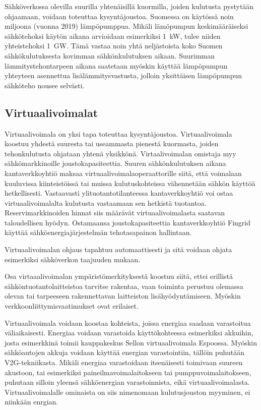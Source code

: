   Sähköverkossa olevilla suurilla yhtenäisillä kuormilla, joiden kulutusta pystytään ohjaamaan, voidaan toteuttaa kysyntäjoustoa. Suomessa on käytössä noin miljoona (vuonna 2019) lämpöpumppua. Mikäli lämöpumpun keskimääräiseksi sähkötehoksi käytön aikana arvioidaan esimerkiksi \SI{1}{\kilo\watt}, tulee niiden yhteistehoksi \SI{1}{\giga\watt}. Tämä vastaa noin yhtä neljästoista koko Suomen sähkökulutuksesta kovimman sähkönkulutuksen aikaan.  Suurimman lämmitystehontarpeen aikana saatetaan myöskin käyttää lämpöpumpun yhteyteen asennettua lisälämmitysvastusta, jolloin yksittäisen lämpöpumpun sähköteho nousee selvästi.

\subsection{Virtuaalivoimalat}

  Virtuaalivoimala on yksi tapa toteuttaa kysyntäjoustoa. Virtuaalivoimala koostuu yhdestä suuresta tai useammasta pienestä kuormasta, joiden tehonkulutusta ohjataan yhtenä yksikkönä. Virtaalivoimalan omistaja myy sähkömarkkinoille joustokapasiteettia. Suuren sähkönkulutuksen aikana kantaverkkoyhtiö maksaa virtuaalivoimalaoperaattorille siitä, että voimalaan kuuluvissa kiinteistöissä tai muissa kulutuskohteissa vähennetään sähkön käyttöä hetkellisesti. Vastaavasti ylituotantotilanteessa kantaverkkoyhtiö voi ostaa virtuaalivoimalalta kulutusta vastaamaan sen hetkistä tuotantoa. Reservimarkkinoiden hinnat siis määrävät virtuaalivoimalasta saatavan taloudellisen hyödyn. Ostamaansa joustokapasiteettia kantaverkkoyhtiö Fingrid käyttää sähköenergiajärjestelmän tehotasapainon hallintaan.

  Virtuaalivoimalan ohjaus tapahtuu automaattisesti ja sitä voidaan ohjata esimerkiksi sähköverkon taajuuden mukaan.

  Osa virtaaalivoimalan ympäristömerkityksestä koostuu siitä, ettei erillistä sähköntuotantolaitteistoa tarvitse rakentaa, vaan toiminta perustuu olemassa olevan tai tarpeeseen rakennettavan laitteiston lisähyödyntämiseen. Myöskin verkkoonliittymisvaatimukset ovat erilaiset. 

  Virtuaalivoimala voidaan koostaa kohteista, joissa energiaa saadaan varastoitua väliaikaisesti. Energiaa voidaan varastoida käyttökohteessa esimerkiksi akkuihin, josta esimerkkinä toimii kauppakeskus Sellon virtuaalivoimala Espoossa. Myöskin sähköautojen akkuja voidaan käyttää energian varastointiin, tällöin puhutään V2G-tekniikasta. Mikäli energiaa varastoidaan itsenäisesti toimivaan suureen akustoon, tai esimerkiksi paineilmavoimalaitokseen tai pumppuvoimalaitokseen, puhutaan silloin yleensä sähköenergian varastoinnista, eikä virtuaalivoimalasta. Virtuaalivoimalalle ominaista on siis nimenomaan kulutusjouston myyminen, ei niinkään enrgian.

